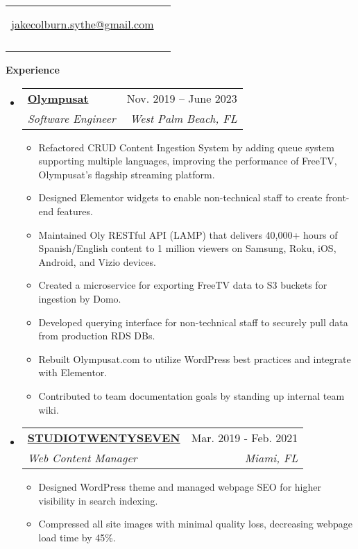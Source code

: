 \documentclass[letterpaper,10pt]{article}[leftmargin=*]
\makeatletter
\def \fullname {Jake Colburn}
\def \subtitle {}
\def \linkedinicon {\faLinkedin}
\def \linkedinlink {https://www.linkedin.com/in/jake-colburn-71401811/}
\def \linkedintext {/jake-colburn}
\def \phoneicon {\faPhone}
\def \phonetext {512-621-6131}
\def \emailicon {\faEnvelope}
\def \emaillink {mailto:jakecolburn.sythe@gmail.com}
\def \emailtext {jakecolburn.sythe@gmail.com}
\def \headertype {\singlecol} %
\def \entryspacing {-0pt}
\def \linkedin {\linkedinicon \hspace{3pt}\href{\linkedinlink}{\linkedintext}}
\def \phone {\phoneicon \hspace{3pt}{ \phonetext}}
\def \email {\emailicon \hspace{3pt}\href{\emaillink}{\emailtext}}
\renewcommand{\section}[2]{\vspace{5pt}
  \colorbox{secondary}{\color{white}\raggedbottom\normalsize\textbf{{#1}{\hspace{7pt}#2}}}
}
\newcommand{\resumeEntryStart}{\begin{itemize}[leftmargin=2.5mm]}
\newcommand{\resumeEntryEnd}{\end{itemize}\vspace{\entryspacing}}
\newcommand{\resumeItemListStart}{\begin{itemize}[leftmargin=4.5mm]}
\newcommand{\resumeItemListEnd}{\end{itemize}}
\newcommand{\resumeItem}[1]{
  \item\small{
    {#1 \vspace{-2pt}}
  }
}
\newcommand{\resumeEntryTSDL}[4]{
  \vspace{-1pt}\item[]
    \begin{tabularx}{0.97\textwidth}{X@{\hspace{60pt}}r}
      \textbf{\color{primary}#1} & {\firabook\color{accent}\small#2} \\
      \textit{\color{accent}\small#3} & \textit{\color{accent}\small#4} \\
    \end{tabularx}\vspace{-6pt}
}
\newcommand{\doublecol}[6]{
  \begin{tabularx}{\textwidth}{Xr}
    {
      \begin{tabular}[c]{l}
        \fontsize{35}{45}\selectfont{\color{primary}{{\textbf{\fullname}}}} \\
        {\textit{\subtitle}} %
      \end{tabular}
    } & {
      \begin{tabular}[c]{l@{\hspace{1.5em}}l}
        {\small#4} & {\small#1} \\
        {\small#5} & {\small#2} \\
        {\small#6} & {\small#3}
      \end{tabular}
    }
  \end{tabularx}
}
\newcommand{\singlecol}[6]{
  \begin{tabularx}{\textwidth}{Xr}
    {
      \begin{tabular}[b]{l}
        \fontsize{35}{45}\selectfont{\color{primary}{{\textbf{\fullname}}}} \\
        {\textit{\subtitle}} %
      \end{tabular}
    } & {
      \begin{tabular}[c]{l}
        {\small#1} \\
        {\small#2} \\
        {\small#3} \\
        {\small#4} \\
        {\small#5} \\
        {\small#6}
      \end{tabular}
    }
  \end{tabularx}
}
\makeatother
\begin{document}


\headertype{\linkedin}{\email}{}{\phone}{}{} %
\vspace{-10pt} %

\section{\faPieChart}{Experience}

  \resumeEntryStart
    \resumeEntryTSDL
      {\href{https://www.linkedin.com/company/olympusat/}{Olympusat}}{Nov. 2019 -- June 2023}
      {Software Engineer}{West Palm Beach, FL}
    \resumeItemListStart
      \resumeItem {Refactored CRUD Content Ingestion System by adding queue system supporting multiple languages, improving the performance of FreeTV, Olympusat’s flagship streaming platform.}
      \resumeItem {Designed Elementor widgets to enable non-technical staff to create front-end features.}
      \resumeItem {Maintained Oly RESTful API (LAMP) that delivers 40,000+ hours of Spanish/English content to 1 million viewers on Samsung, Roku, iOS, Android, and Vizio devices.}
        \resumeItem{Created a microservice for exporting FreeTV data to S3 buckets for ingestion by Domo.}
        \resumeItem{Developed querying interface for non-technical staff to securely pull data from production RDS DBs.}
        \resumeItem{Rebuilt Olympusat.com to utilize WordPress best practices and integrate with Elementor.}
        \resumeItem{Contributed to team documentation goals by standing up internal team wiki.}
    \resumeItemListEnd
  \resumeEntryEnd

  \resumeEntryStart
    \resumeEntryTSDL
      {\href{https://studiotwentyseven.com/}{STUDIOTWENTYSEVEN}}{Mar. 2019 - Feb. 2021}
      {Web Content Manager}{Miami, FL}
    \resumeItemListStart
      \resumeItem {Designed WordPress theme and managed webpage SEO for higher visibility in search indexing.}
      \resumeItem {Compressed all site images with minimal quality loss, decreasing webpage load time by 45\%.}
    \resumeItemListEnd
  \resumeEntryEnd

\end{document}
